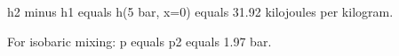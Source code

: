 h2 minus h1 equals h(5 bar, x=0) equals 31.92 kilojoules per kilogram.  

For isobaric mixing: p equals p2 equals 1.97 bar.